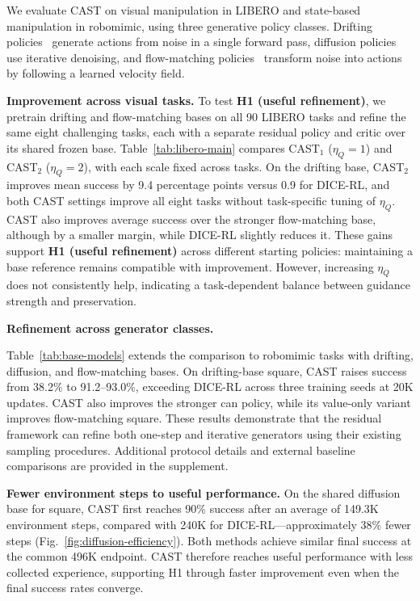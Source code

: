 We evaluate CAST on visual manipulation in LIBERO and state-based manipulation in robomimic, using three generative policy classes. Drifting policies~\cite{deng2026drifting} generate actions from noise in a single forward pass, diffusion policies~\cite{chi2025diffusionpolicy} use iterative denoising, and flow-matching policies~\cite{lipman2022flow} transform noise into actions by following a learned velocity field.

\textbf{Improvement across visual tasks.}
To test \textbf{H1  (useful refinement)}, we pretrain drifting and flow-matching bases on all 90 LIBERO tasks and refine the same eight challenging tasks, each with a separate residual policy and critic over its shared frozen base. Table~\ref{tab:libero-main} compares CAST$_1$ ($\eta_Q=1$) and CAST$_2$ ($\eta_Q=2$), with each scale fixed across tasks. On the drifting base, CAST$_2$ improves mean success by 9.4 percentage points versus 0.9 for DICE-RL, and both CAST settings improve all eight tasks without task-specific tuning of $\eta_Q$. CAST also improves average success over the stronger flow-matching base, although by a smaller margin, while DICE-RL slightly reduces it. These gains support \textbf{H1  (useful refinement)} across different starting policies: maintaining a base reference remains compatible with improvement. However, increasing $\eta_Q$ does not consistently help, indicating a task-dependent balance between guidance strength and preservation.

\textbf{Refinement across generator classes.}
\label{sec:exp-robomimic}

Table~\ref{tab:base-models} extends the comparison to robomimic tasks with drifting, diffusion, and flow-matching bases. On drifting-base square, CAST raises success from 38.2\% to 91.2--93.0\%, exceeding DICE-RL across three training seeds at 20K updates. CAST also improves the stronger can policy, while its value-only variant improves flow-matching square. These results demonstrate that the residual framework can refine both one-step and iterative generators using their existing sampling procedures. Additional protocol details and external baseline comparisons are provided in the supplement.


\textbf{Fewer environment steps to useful performance.}
On the shared diffusion base for square, CAST first reaches 90\% success after an average of 149.3K environment steps, compared with 240K for DICE-RL---approximately 38\% fewer steps (Fig.~\ref{fig:diffusion-efficiency}). Both methods achieve similar final success at the common 496K endpoint. CAST therefore reaches useful performance with less collected experience, supporting H1 through faster improvement even when the final success rates converge.

